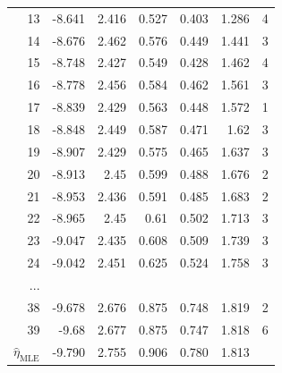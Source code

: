 \documentclass[slidestop,compress, 10pt]{beamer}
\newcommand{\etaMLE}{\hat{\eta}_{\textrm{MLE}}}
\begin{document}
{{\begin{table}
\begin{center}
\begin{tabular}{rrrrrrr}
13&	-8.641&	2.416&	0.527&	0.403&	1.286 & 4\\%
14&	-8.676&	2.462&	0.576&	0.449&	1.441 & 3\\%
15&	-8.748&	2.427&	0.549&	0.428&	1.462 & 4\\%
16&	-8.778&	2.456&	0.584&	0.462&	1.561 & 3\\%
17&	-8.839&	2.429&	0.563&	0.448&	1.572 & 1\\%
18&	-8.848&	2.449&	0.587&	0.471&	1.62	 & 3\\%
19&	-8.907&	2.429&	0.575&	0.465&	1.637 & 3\\%
20&	-8.913&	2.45	& 	0.599&	0.488&	1.676 & 2\\%
21&	-8.953&	2.436&	0.591&	0.485&	1.683 & 2\\%
22&	-8.965&	2.45	& 	0.61&	0.502&	1.713 & 3\\%
23&	-9.047&	2.435&	0.608&	0.509&	1.739 & 3\\%
24&	-9.042&	2.451&	0.625&	0.524&	1.758 & 3\\%
...\\
38&	-9.678&	2.676&	0.875&	0.748&	1.819&	2\\%
39&	-9.68&	2.677&	0.875&	0.747&	1.818 & 6\\%
\hline
 $\etaMLE$ & -9.790 & 2.755 & 0.906 & 0.780 & 1.813 \\ [1ex] 


\end{tabular}
\end{center}
\end{table}}}
\end{document}
